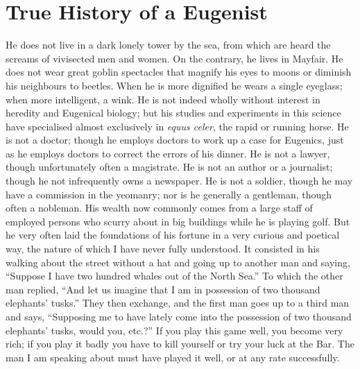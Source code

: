 \documentclass{book}
\begin{document}
\chapter{True History of a Eugenist}
\label{chapter-13}
He does not live in a dark lonely tower by the sea, from which are heard the screams of vivisected men and women. On the contrary, he lives in Mayfair. He does not wear great goblin spectacles that magnify his eyes to moons or diminish his neighbours to beetles. When he is more dignified he wears a single eyeglass; when more intelligent, a wink. He is not indeed wholly without interest in heredity and Eugenical biology; but his studies and experiments in this science have specialised almost exclusively in \emph{equus celer}, the rapid or running horse. He is not a doctor; though he employs doctors to work up a case for Eugenics, just as he employs doctors to correct the errors of his dinner. He is not a lawyer, though unfortunately often a magistrate. He is not an author or a journalist; though he not infrequently owns a newspaper. He is not a soldier, though he may have a commission in the yeomanry; nor is he generally a gentleman, though often a nobleman. His wealth now commonly comes from a large staff of employed persons who scurry about in big buildings while he is playing golf. But he very often laid the foundations of his fortune in a very curious and poetical way, the nature of which I have never fully understood. It consisted in his walking about the street without a hat and going up to another man and saying, “Suppose I have two hundred whales out of the North Sea.” To which the other man replied, “And let us imagine that I am in possession of two thousand elephants’ tusks.” They then exchange, and the first man goes up to a third man and says, “Supposing me to have lately come into the possession of two thousand elephants’ tusks, would you, etc.?” If you play this game well, you become very rich; if you play it badly you have to kill yourself or try your luck at the Bar. The man I am speaking about must have played it well, or at any rate successfully.
\end{document}
